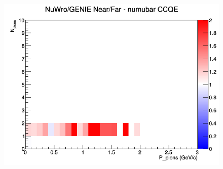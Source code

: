 \documentclass[12pt]{article}
\begin{document}
\begin{figure}[h]
\endminipage
{}
\includegraphics[width=\linewidth]{N_P/nominal/pions/ratios/CCQE_NuWro_GENIE_numubar_NF_N_P.png}
\endminipage
\newline
\end{figure}
\clearpage
\end{document}
